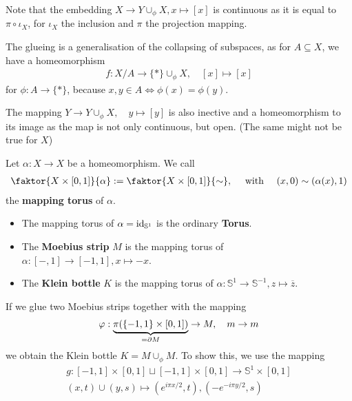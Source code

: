 \begin{rem}[]
  Note that the embedding $X \to Y \cup_{\phi}X, x \mapsto [x]$
  is continuous as it is equal to $\pi \circ \iota_X$, for $\iota_X$ the inclusion and $\pi$ the projection mapping.

  The glueing is a generalisation of the collapsing of subspaces, as for $A \subseteq X$, we have a homeomorphism
  \begin{align*}
    f: X/A \to \{\ast\} \cup_{\phi} X, \quad [x] \mapsto  [x]
  \end{align*}
  for $\phi: A \to \{\ast\}$, because $x,y \in A \iff \phi(x) = \phi(y)$.

    The mapping $Y \to Y \cup_{\phi} X, \quad y \mapsto [y]$ is also inective and a homeomorphism to its image as the map is not only continuous, but open.
    (The same might not be true for $X$)
\end{rem}

\begin{ex}
  Let $\alpha: X \to  X$ be a homeomorphism.
  We call
  \begin{align*}
    \faktor{X \times [0,1]}{\alpha} := \faktor{X \times [0,1]}{\sim}, \quad \text{ with } \quad (x,0) \sim (\alpha(x),1)
  \end{align*}
  the \textbf{mapping torus} of $\alpha$.
  
  \begin{itemize}
    \item The mapping torus of $\alpha = \operatorname{id}_{\mathbb{S}^{1}}$ is the ordinary \textbf{Torus}.
    \item The \textbf{Moebius strip} $M$ is the mapping torus of $\alpha: [-,1] \to  [-1,1], x \mapsto -x$.
    \item The \textbf{Klein bottle} $K$ is the mapping torus of $\alpha: \mathbb{S}^{1} \to \mathbb{S}^{-1}, z \mapsto \overline{z}$.
  \end{itemize}
  If we glue two Moebius strips together with the mapping 
  \begin{align*}
  \varphi: 
  \underbrace{\pi(\{-1,1\} \times[0,1])}_{= \partial M} \to M
  , \quad 
  m \to  m
  \end{align*}
  we obtain the Klein bottle $K = M \cup_{\phi} M$.
  To show this, we use the mapping
  \begin{align*}
    g: [-1,1] \times [0,1] \sqcup [-1,1] \times [0,1] \to  \mathbb{S}^{1} \times [0,1]
    \\
    (x,t) \cup (y,s) \mapsto (e^{i\pi x /2},t), (-e^{-i \pi y/2},s)
  \end{align*}

  
\end{ex}




